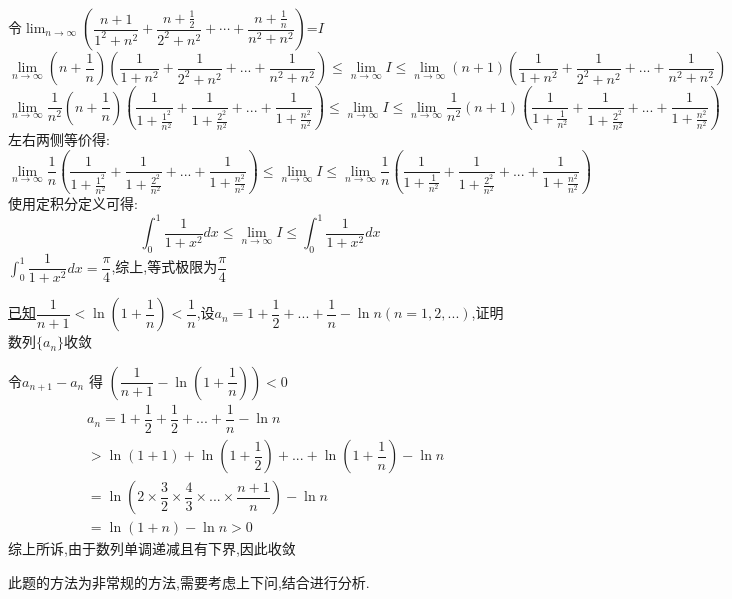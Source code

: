 \documentclass[8pt a4paper, oneside, UTF8]{ctexbook}
\begin{document}
\begin{sloppypar}
\begin{problem}
    \end{problem}
    \begin{solution}
        令$\lim_{n\to\infty}\left(\dfrac{n+1}{1^{2}+n^{2}}+\dfrac{n+\frac{1}{2}}{2^{2}+n^{2}}+\cdots+\dfrac{n+\frac{1}{n}}{n^{2}+n^{2}}\right)$=$I$
            $$
                \lim_{n \to \infty} (n+\frac{1}{n})(\dfrac{1}{1+n^2}+\dfrac{1}{2^2+n^2}+...+\dfrac{1}{n^2+n^2}) \leqslant   \lim_{n\to \infty}I \leqslant \lim_{n \to \infty} (n+1)(\dfrac{1}{1+n^2}+\dfrac{1}{2^2+n^2}+...+\dfrac{1}{n^2+n^2})
            $$
            $$
                \lim_{n \to \infty} \dfrac{1}{n^2}(n+\frac{1}{n})(\dfrac{1}{1+\frac{1^2}{n^2}}+\dfrac{1}{1+\frac{2^2}{n^2}}+...+\dfrac{1}{1+\frac{n^2}{n^2}}) \leqslant \lim_{n\to \infty}I \leqslant \lim_{n \to \infty}\frac{1}{n^2} (n+1)(\dfrac{1}{1+\frac{1}{n^2}}+\dfrac{1}{1+\frac{2^2}{n^2}}+...+\dfrac{1}{1+\frac{n^2}{n^2}})
            $$
            左右两侧等价得:
            $$
            \lim_{n \to \infty} \dfrac{1}{n}(\dfrac{1}{1+\frac{1^2}{n^2}}+\dfrac{1}{1+\frac{2^2}{n^2}}+...+\dfrac{1}{1+\frac{n^2}{n^2}}) \leqslant \lim_{n\to \infty} I \leqslant \lim_{n \to \infty}\frac{1}{n}(\dfrac{1}{1+\frac{1}{n^2}}+\dfrac{1}{1+\frac{2^2}{n^2}}+...+\dfrac{1}{1+\frac{n^2}{n^2}})
            $$
            使用定积分定义可得:
            $$
            \int_0 ^1 \dfrac{1}{1+x^2}dx \leqslant \lim_{n\to \infty} I \leqslant \int_0^1 \dfrac{1}{1+x^2}dx
            $$
        $\int_0 ^1 \dfrac{1}{1+x^2}dx=\dfrac{\pi}{4}$,综上,等式极限为$\dfrac{\pi}{4}$
    \end{solution}
    \begin{problem}
        \uline{已知}$\dfrac1{n+1}<\ln(1+\dfrac1n)<\dfrac1n$,设$a_n=1+\dfrac12+...+\dfrac1n-\ln n(n=1,2,...)$,证明数列$\{a_n\}$收敛
    \end{problem}
    \begin{solution}
        令$a_{n+1}-a_n$ 得 $(\dfrac{1}{n+1}-\ln(1+\dfrac{1}{n}))<0$
        \begin{align*}
          & a_n= 1+\dfrac{1}{2}+\dfrac{1}{2}+...+\dfrac{1}{n}-\ln n\\
          & > \ln(1+1)+\ln(1+\dfrac{1}{2})+...+\ln(1+\dfrac{1}{n})-\ln n \\
          & =\ln(2 \times \dfrac{3}{2} \times \dfrac{4}{3} \times ... \times \dfrac{n+1}{n})-\ln n\\
          & = \ln(1+n)-\ln n >0
        \end{align*}
    综上所诉,由于数列单调递减且有下界,因此收敛
    \end{solution}
    \begin{note}
        此题的方法为非常规的方法,需要考虑上下问,结合进行分析.
    \end{note}

\end{sloppypar}
\end{document}
